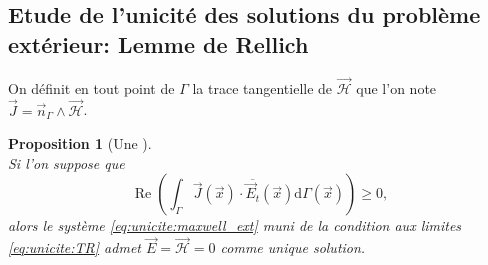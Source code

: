 \documentclass[12pt,%
    twoside,%
    a4paper,%
    openright, %
    ]{book}
\numberwithin{equation}{section} %
\newtheorem{prop}[thm]{Proposition}
\newcommand{\pvect}{\wedge}
\newcommand{\vect}[1]{{\overset{\rightarrow}{#1}}}
\newcommand{\conj}[1]{{\overline{#1}}}
\newcommand{\dd}{\mathrm{d}}
\renewcommand{\Re}{\operatorname{Re}}
\newcommand{\vE}{\vect{E}}
\newcommand{\cH}{\mathcal{H}}
\newcommand{\vH}{\vect{\cH}}
\newcommand{\vn}{\vect{n}}
\newcommand{\vx}{\vect{x}}
\newcommand{\vJ}{\vect{J}}
\begin{document}
    \subsection{Etude de l'unicité des solutions du problème extérieur: Lemme de Rellich}

        On définit en tout point de \(\Gamma\) la trace tangentielle de \(\vH\) que l'on note \(\vJ = \vn_\Gamma \pvect \vH\).
        \begin{prop}[Une ]~\\
        Si l'on suppose que
        \begin{equation}
            \label{eq:unicite:form_var:cgu}
            \Re\left(\int_\Gamma \vJ(\vx) \cdot \conj{\vE_t}(\vx) \dd{\Gamma(\vx)}\right) \ge 0,
        \end{equation}
        alors le système \eqref{eq:unicite:maxwell_ext} muni de la condition aux limites \eqref{eq:unicite:TR} admet \(\vE=\vH=0\) comme unique solution.
        \end{prop}
    
\end{document}
